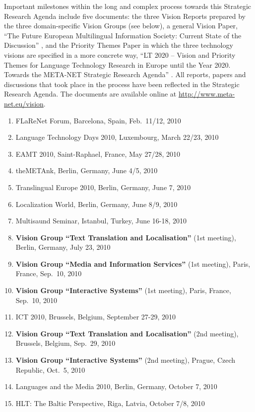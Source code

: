 \documentclass[10pt, plain]{../../metanetpaper}
\begin{document}
Important milestones within the long and complex process towards this Strategic Research Agenda include five documents: the three Vision Reports prepared by the three domain-specific Vision Groups (see below), a general Vision Paper, ``The Future European Multilingual Information Society: Current State of the Discussion'' \cite{Meta1}, and the Priority Themes Paper in which the three technology visions are specified in a more concrete way, ``LT 2020 -- Vision and Priority Themes for Language Technology Research in Europe until the Year 2020. Towards the META-NET Strategic Research Agenda'' \cite{LT2020}. All reports, papers and discussions that took place in the process have been reflected in the Strategic Research Agenda. The documents are available online at \url{http://www.meta-net.eu/vision}.

\begin{small}
\begin{enumerate}
\item FLaReNet Forum, Barcelona, Spain, Feb.~11/12, 2010
\item Language Technology Days 2010, Luxembourg, March 22/23, 2010
\item EAMT 2010, Saint-Raphael, France, May 27/28, 2010
\item theMETAnk, Berlin, Germany, June 4/5, 2010
\item Translingual Europe 2010, Berlin, Germany, June 7, 2010
\item Localization World, Berlin, Germany, June 8/9, 2010
\item Multisaund Seminar, Istanbul, Turkey, June 16-18, 2010
\item \textbf{Vision Group ``Text Translation and Localisation''} (1st meeting), Berlin, Germany, July 23, 2010
\item \textbf{Vision Group ``Media and Information Services''} (1st meeting), Paris, France, Sep.~10, 2010
\item \textbf{Vision Group ``Interactive Systems''} (1st meeting), Paris, France, Sep.~10, 2010
\item ICT 2010, Brussels, Belgium, September 27-29, 2010
\item \textbf{Vision Group ``Text Translation and Localisation''} (2nd meeting), Brussels, Belgium, Sep.~29, 2010
\item \textbf{Vision Group ``Interactive Systems''} (2nd meeting), Prague, Czech Republic, Oct.~5, 2010
\item Languages and the Media 2010, Berlin, Germany, October 7, 2010
\item HLT: The Baltic Perspective, Riga, Latvia, October 7/8, 2010

\end{enumerate}
\end{small}
\end{document}
